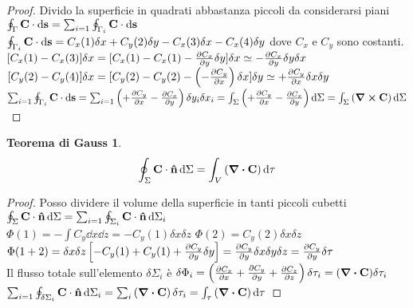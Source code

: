 \documentclass[12pt,a4paper]{article}
\begin{document}
\begin{proof}
    Divido la superficie in quadrati abbastanza piccoli da considerarsi piani
    $\oint_{\Gamma}\vb{C}\cdot \dd{\vb{s}}= \sum_{i=1}\oint_{\Gamma_{i}}\vb{C}\cdot \dd{\vb{s}}$\\
    $\oint_{\Gamma_{i}}\vb{C}\cdot \dd{\vb{s}}= C_{x}(1)\delta x +C_{y}(2)\delta y -C_{x}(3)\delta x -C_{x}(4)\delta y $ dove $C_{x}$ e $C_{y}$ sono costanti.
    \\$[C_{x}(1)-C_{x}(3)]\delta x = [C_{x}(1)-C_{x}(1)-\pdv{C_x}{y}\delta y]\delta x \simeq -\pdv{C_x}{y}\delta y\delta x$
    \\$[C_{y}(2)-C_{y}(4)]\delta x = [C_{y}(2)-C_{y}(2)-\left( -\pdv{C_y}{x} \right)\delta x]\delta y \simeq +\pdv{C_y}{x}\delta x\delta y$
    \\$ \sum_{i=1}\oint_{\Gamma_{i}}\vb{C}\cdot \dd{\vb{s}}= \sum_{i=1}\left( +\pdv{C_y}{x} -\pdv{C_x}{y}\right) \delta y_{i}\delta x_{i}
    = \int_{\Sigma}\left( +\pdv{C_y}{x} -\pdv{C_x}{y}\right) \dd{\Sigma} =  \int_{\Sigma}\left( \curl \vb{C}\right) \dd{\Sigma}  $
\end{proof}

\newtheorem*{TG}{Teorema di Gauss}
\begin{TG}
    \begin{equation*}
        \oint_{\Sigma} \vb{C}\cdot\vu{n}\dd{\Sigma}= \int_{V}\left( \div\vb{C} \right) \dd{\tau}
    \end{equation*}
\end{TG}
\begin{proof}
    Posso dividere il volume della superficie in tanti piccoli cubetti
    \\ $\oint_{\Sigma} \vb{C}\cdot\vu{n}\dd{\Sigma}= \sum_{i=1} \oint_{\Sigma_{i}} \vb{C}\cdot\vu{n} \dd{\Sigma_{i}}$ 
    \\$\Phi(1) = -\int C_{y}\dd{x}\dd{z} =- C_{y}(1)\delta x \delta z$ \quad
    $\Phi(2) =  C_{y}(2)\delta x \delta z$
    \\$\Phi(1+2)= \delta x \delta z\left[ - C_{y}(1) + C_{y}(1)+ \pdv{C_y}{y}\delta y\right]= \pdv{C_y}{y}\delta x \delta y \delta z = \pdv{C_y}{y} \delta \tau $
    \\ Il flusso totale sull'elemento $\delta\Sigma_i$ è $\delta\Phi_i= \left( \pdv{C_x}{x}+\pdv{C_y}{y} +\pdv{C_z}{z}\right)\delta\tau_i= (\div \vb{C})\delta\tau_i$
    \\ $\sum_{i=1}\oint_{\delta\Sigma_i}\vb{C}\cdot\vu{n}\dd{\Sigma_i} = \sum_i \left( \div \vb{C} \right) \delta\tau_i = 
    \int_\tau \left( \div \vb{C} \right)\dd{\tau}$
\end{proof}
\end{document}
